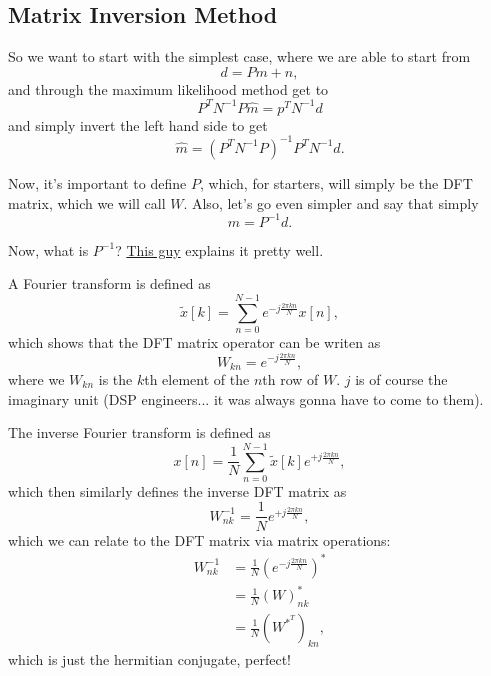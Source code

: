 \documentclass{article}
\begin{document}
\subsection{Matrix Inversion Method}

So we want to start with the simplest case, where we are able to start from
\begin{equation}
	d = Pm + n,
\end{equation}
and through the maximum likelihood method get to
\begin{equation}
	P^T N^{-1}P \hat m = p^T N^{-1}d
\end{equation}
and simply invert the left hand side to get
\begin{equation}
	\hat m = (P^T N^{-1}P)^{-1}P^T N^{-1}d.
\end{equation}

Now, it's important to define $P$, which, for starters, will simply be the DFT matrix, which we will call $W$. Also, let's go even simpler and say that simply
\begin{equation}
	m = P^{-1}d.
\end{equation}

Now, what is $P^{-1}$? \href{https://www.youtube.com/watch?v=Er-FcErLXrQ}{This guy} explains it pretty well.

A Fourier transform is defined as 
\begin{equation}
	\tilde x[k] = \sum_{n=0}^{N-1} e^{-j\frac{2\pi kn}{N}} x[n],
\end{equation}
which shows that the DFT matrix operator can be writen as
\begin{equation}
	W_{kn} = e^{-j\frac{2\pi kn}{N}},
\end{equation}
where we $W_{kn}$ is the $k$th element of the $n$th row of $W$. $j$ is of course the imaginary unit (DSP engineers... it was always gonna have to come to them).

The inverse Fourier transform is defined as
\begin{equation}
	x[n]=\frac{1}{N} \sum_{n=0}^{N-1} \tilde x[k] e^{+j\frac{2\pi kn}{N}},
\end{equation}
which then similarly defines the inverse DFT matrix as
\begin{equation}
	W^{-1}_{nk} = \frac{1}{N} e^{+j\frac{2\pi kn}{N}},
\end{equation}
which we can relate to the DFT matrix via matrix operations:
\begin{align}
	W^{-1}_{nk} &= \frac{1}{N} (e^{-j\frac{2\pi kn}{N}})^*\\
	&= \frac{1}{N} (W)^*_{nk}\\
	&= \frac{1}{N} (W^{*^T})_{kn},
\end{align}
which is just the hermitian conjugate, perfect!
\end{document}
